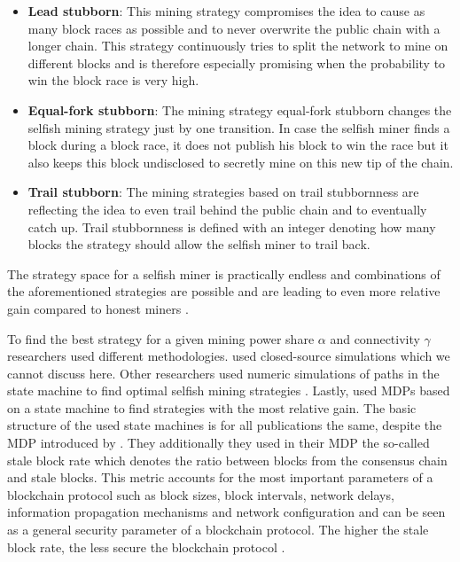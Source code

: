 \begin{itemize}
	\item \textbf{Lead stubborn}: 
	This mining strategy compromises the idea to cause as many block races as possible and to never overwrite the public chain with a longer chain.
	This strategy continuously tries to split the network to mine on different blocks and is therefore especially promising when the probability to win the block race is very high.
	\item \textbf{Equal-fork stubborn}: 
	The mining strategy equal-fork stubborn changes the selfish mining strategy just by one transition.
	In case the selfish miner finds a block during a block race, it does not publish his block to win the race but it also keeps this block undisclosed to secretly mine on this new tip of the chain.
\item \textbf{Trail stubborn}: 
The mining strategies based on trail stubbornness are reflecting the idea to even trail behind the public chain and to eventually catch up.
	Trail stubbornness is defined with an integer denoting how many blocks the strategy should allow the selfish miner to trail back.
\end{itemize}

The strategy space for a selfish miner is practically endless and combinations of the aforementioned strategies are possible and are leading to even more relative gain compared to honest miners \cite{nayak2016stubborn,sapirshtein2016optimal, gervais2015tampering, gervais2016security, bahack2013theoretical}.


To find the best strategy for a given mining power share $\alpha$ and connectivity $\gamma$ researchers used different methodologies.
\cite{eyal2014majority, sapirshtein2016optimal} used closed-source simulations which we cannot discuss here.
Other researchers used numeric simulations of paths in the state machine to find optimal selfish mining strategies \cite{gervais2015tampering, nayak2016stubborn}.
Lastly, \cite{sapirshtein2016optimal, gervais2016security} used MDPs based on a state machine to find strategies with the most relative gain.
The basic structure of the used state machines is for all publications the same, despite the MDP introduced by \cite{gervais2016security}.
They additionally they used in their MDP the so-called stale block rate which denotes the ratio between blocks from the consensus chain and stale blocks.
This metric accounts for the most important parameters of a blockchain protocol such as block sizes, block intervals, network delays, information propagation mechanisms and network configuration and can be seen as a general security parameter of a blockchain protocol.
The higher the stale block rate, the less secure the blockchain protocol \cite{gervais2016security}.

